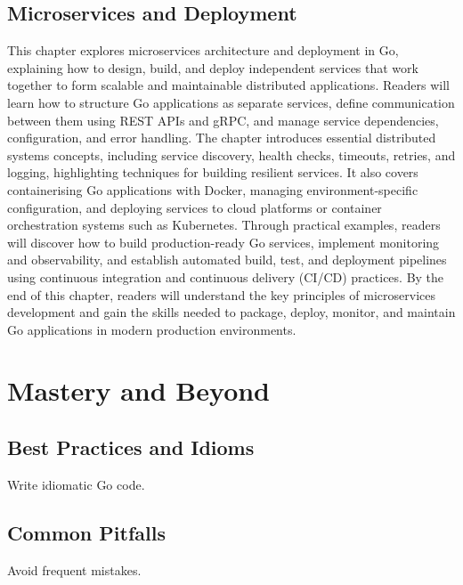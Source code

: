 \documentclass[12pt,oneside]{book}
\begin{document}
\chapter{Microservices and Deployment}
\begin{chaptersummary}
This chapter explores microservices architecture and deployment in Go, explaining how to design, build, and deploy independent services that work together to form scalable and maintainable distributed applications. Readers will learn how to structure Go applications as separate services, define communication between them using REST APIs and gRPC, and manage service dependencies, configuration, and error handling. The chapter introduces essential distributed systems concepts, including service discovery, health checks, timeouts, retries, and logging, highlighting techniques for building resilient services. It also covers containerising Go applications with Docker, managing environment-specific configuration, and deploying services to cloud platforms or container orchestration systems such as Kubernetes. Through practical examples, readers will discover how to build production-ready Go services, implement monitoring and observability, and establish automated build, test, and deployment pipelines using continuous integration and continuous delivery (CI/CD) practices. By the end of this chapter, readers will understand the key principles of microservices development and gain the skills needed to package, deploy, monitor, and maintain Go applications in modern production environments.
\end{chaptersummary}


\part{Mastery and Beyond}

\chapter{Best Practices and Idioms}
\begin{chaptersummary}
Write idiomatic Go code.
\end{chaptersummary}


\chapter{Common Pitfalls}
\begin{chaptersummary}
Avoid frequent mistakes.
\end{chaptersummary}

\end{document}
